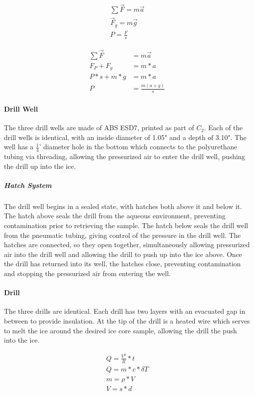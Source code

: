 \documentclass{article}
\begin{document}
\begin{gather*}
    \sum \vec{F} = m \vec{a} \\
    \vec{F}_g = m \vec{g}\\
    P = \frac{F}{s}
\end{gather*}

\begin{align*}
    \sum \vec{F} &= m \vec{a} \\
    F_P + F_g &= m*a \\
    P*s + m*g &= m*a \\
    P &= \frac{m (a+g)}{s}
\end{align*}

\paragraph{Drill Well}
The three drill wells are made of ABS ESD7, printed as part of $C_2$. Each of the drill wells is identical, with an inside diameter of 1.05" and a depth of 3.10". The well has a $\frac{1}{4}$' diameter hole in the bottom which connects to the polyurethane tubing via threading, allowing the pressurized air to enter the drill well, pushing the drill up into the ice.
\subparagraph{Hatch System}
The drill well begins in a sealed state, with hatches both above it and below it. The hatch above seals the drill from the aqueous environment, preventing contamination prior to retrieving the sample. The hatch below seals the drill well from the pneumatic tubing, giving control of the pressure in the drill well. The hatches are connected, so they open together, simultaneously allowing pressurized air into the drill well and allowing the drill to push up into the ice above. Once the drill has returned into its well, the hatches close, preventing contamination and stopping the pressurized air from entering the well.
\paragraph{Drill}
The three drills are identical. Each drill has two layers with an evacuated gap in between to provide insulation. At the tip of the drill is a heated wire which serves to melt the ice around the desired ice core sample, allowing the drill the push into the ice.

\begin{gather*}
    Q = \frac{V^2}{R}*t \\
    Q = m*c*\delta T \\
    m = \rho * V \\
    V = s*d \\
\end{gather*}
\end{document}
